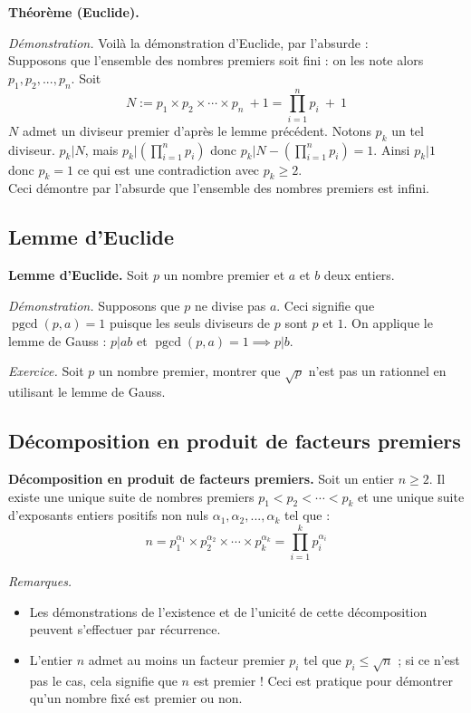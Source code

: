 \documentclass[11pt,class=report,crop=false]{standalone}
\newcommand{\pgcd}{\mathop{\mathrm{pgcd}}\nolimits}
\begin{document}
\textbf{Théorème (Euclide).}


\emph{Démonstration.}
Voilà la démonstration d'Euclide, par l'absurde :\\
    Supposons que l'ensemble des nombres premiers soit fini : on les note alors $p_1, p_2, ..., p_n$. Soit 
    $$N := p_1 \times p_2 \times \cdots \times p_n \ + 1 = \prod_{i=1}^n p_i \ + \ 1$$
     $N$ admet un diviseur premier d'après le lemme précédent. Notons $p_k$ un tel diviseur. $p_k|N$, mais $p_k | (\prod_{i=1}^n p_i)$ donc $p_k|N-(\prod_{i=1}^np_i)=1$. Ainsi $p_k|1$ donc $p_k=1$ ce qui est une contradiction avec $p_k\geq2$.\\
    Ceci démontre par l'absurde que l'ensemble des nombres premiers est infini.


\subsection*{Lemme d'Euclide}

\textbf{Lemme d'Euclide.}
Soit $p$ un nombre premier et $a$ et $b$ deux entiers. 

\emph{Démonstration.}
Supposons que $p$ ne divise pas $a$. Ceci signifie que $\pgcd(p,a)=1$ puisque les seuls diviseurs de $p$ sont $p$ et $1$. On applique le lemme de Gauss : $p|ab$ et $\pgcd(p,a)=1 \implies p|b$.

\bigskip

\emph{Exercice.}
Soit $p$ un nombre premier, montrer que $\sqrt{p}$ n'est pas un rationnel en utilisant le lemme de Gauss.


\subsection*{Décomposition en produit de facteurs premiers}

\textbf{Décomposition en produit de facteurs premiers.}
Soit un entier $n \geq 2$. Il existe une unique suite de nombres premiers $p_1<p_2<\cdots<p_k$ et une unique suite d'exposants entiers positifs non nuls $\alpha_1,\alpha_2,...,\alpha_k$ tel que : 
$$n = p_1^{\alpha_1} \times p_2^{\alpha_2} \times \cdots \times p_k^{\alpha_k} = \prod_{i=1}^k p_i^{\alpha_i}$$

\emph{Remarques.}
\begin{itemize}
        \item Les démonstrations de l'existence et de l'unicité de cette décomposition peuvent s'effectuer par récurrence. %
        \item L'entier $n$ admet au moins un facteur premier $p_i$ tel que $p_i\leq \sqrt{n}$ ; si ce n'est pas le cas, cela signifie que $n$ est premier ! Ceci est pratique pour démontrer qu'un nombre fixé est premier ou non.
\end{itemize}
\end{document}
